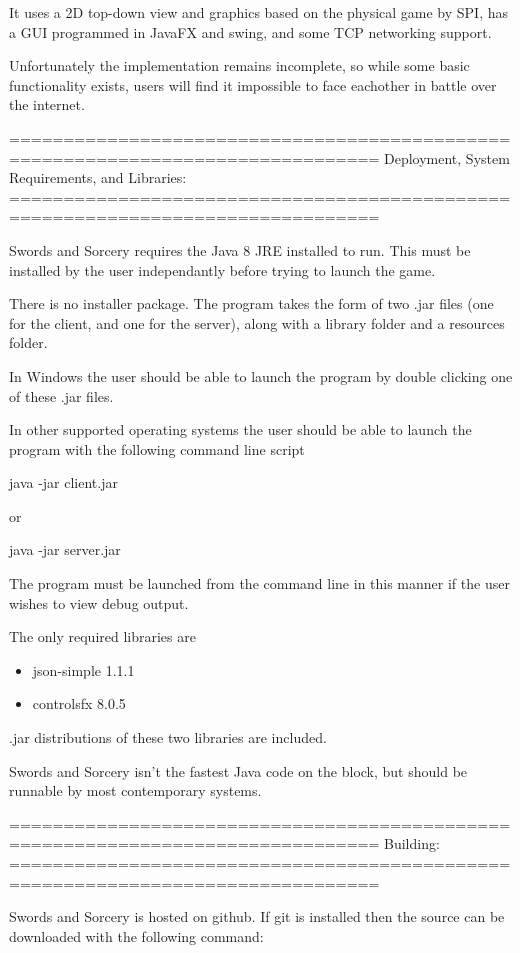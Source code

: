 \documentclass[12pt,a4paper]{article}
\begin{document}
It uses a 2D top-down view and graphics based on the physical game by SPI,
has a GUI programmed in JavaFX and swing, and some TCP networking
support.

Unfortunately the implementation remains incomplete, so while some basic
functionality exists, users will find it impossible to face eachother in battle
over the internet.

================================================================================
Deployment, System Requirements, and Libraries:
================================================================================

Swords and Sorcery requires the Java 8 JRE installed to run. This must be 
installed by the user independantly before trying to launch the game.

There is no installer package. The program takes the form of two .jar files
(one for the client, and one for the server), along with a library folder and a 
resources folder.

In Windows the user should be
able to launch the program by double clicking one of these .jar files. 

In other supported operating systems the user should be able to launch the program
with the following command line script

    java -jar client.jar

or 

    java -jar server.jar

The program must be launched from the command line in this manner if the user wishes
to view debug output.

The only required libraries are

\begin{itemize}
	\item json-simple 1.1.1
	\item controlsfx 8.0.5
\end{itemize}

.jar distributions of these two libraries are included.

Swords and Sorcery isn't the fastest Java code on the block, but should be
runnable by most contemporary systems.

================================================================================
Building:
================================================================================

Swords and Sorcery is hosted on github. If git is installed then the source can
be downloaded with the following command:
\end{document}
